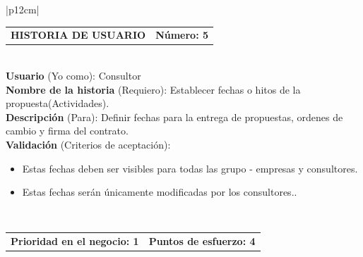 \documentclass[11pt,letterpaper]{report}
\begin{document}
		\begin{center}	
			\begin{tabular}{|p{12cm}|}
				\hline
				\begin{tabular}{c|c}
					\textbf{HISTORIA DE USUARIO} & \textbf{Número: 5} \\
				\end{tabular} \\ \hline
				\textbf{Usuario} (Yo como): Consultor \\ \hline
				\textbf{Nombre de la historia} (Requiero): Establecer fechas o hitos de la propuesta(Actividades). \\ \hline
				\textbf{Descripción} (Para): Definir fechas para la entrega de propuestas, ordenes de cambio y firma del contrato. \\ \hline
				\textbf{Validación} (Criterios de aceptación): \\
				\begin{minipage}{12cm}
					\begin{itemize}
						\item Estas fechas deben ser visibles para todas las grupo - empresas y consultores.
						\item Estas fechas serán únicamente modificadas por los consultores..
					\end{itemize}
				\end{minipage} \\ \hline
				\begin{tabular}{c|c}
					\textbf{Prioridad en el negocio: 1} & \textbf{Puntos de esfuerzo: 4} \\
				\end{tabular} \\ \hline
			\end{tabular}
		\end{center}
	
\end{document}
